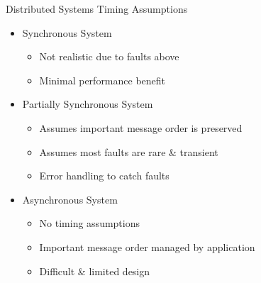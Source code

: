 \documentclass{slide}
\begin{document}
\begin{frame}{Distributed Systems Timing Assumptions}
    \vspace{1mm}
    {\LARGE
    \begin{itemize}
        \item<1-> Synchronous System
        \vspace{-3pt}
        \begin{itemize}
            \Large\item Not realistic due to faults above
            \Large\item Minimal performance benefit
        \end{itemize}
        \vspace{2mm}
        \item<2-> Partially Synchronous System
        \vspace{-3pt}
        \begin{itemize}
            \Large\item Assumes important message order is preserved
            \Large\item Assumes most faults are rare \& transient
            \Large\item Error handling to catch faults
        \end{itemize}
        \vspace{2mm}
        \item<3-> Asynchronous System
        \vspace{-3pt}
        \begin{itemize}
            \Large\item No timing assumptions
            \vspace{-1pt}
            \Large\item Important message order managed by application
            \Large\item Difficult \& limited design
        \end{itemize}
    \end{itemize}
    }
\end{frame}
\end{document}
